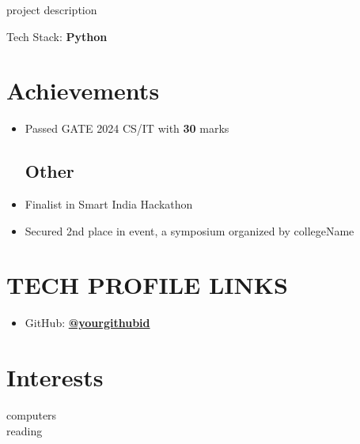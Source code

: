 \documentclass[]{deedy-resume-openfont}
\begin{document}
\begin{minipage}[t]{0.6\textwidth}
\vspace{4pt}
\begin{tightemize}
\item project description
\item Tech Stack: {\bf Python}
\end{tightemize}

\section{Achievements}
\begin{itemize}
\subsection{Academics}
\vspace{4pt}
\item Passed GATE 2024 CS/IT with {\bf 30} marks
\vspace{6pt}
\subsection{Other}
\setlength\itemsep{0em} %
\item Finalist in Smart India Hackathon
\item Secured 2nd place in event, a symposium organized by collegeName
\end{itemize}

\section{TECH PROFILE LINKS}
\vspace{4pt}
\begin{itemize}
\item GitHub: \href{yourGithubLink}{\bf @yourgithubid}
\end{itemize}
\section{Interests}
\vspace{4pt}
computers\\
\vspace{2pt}
reading
\end{minipage} 
\end{document}
